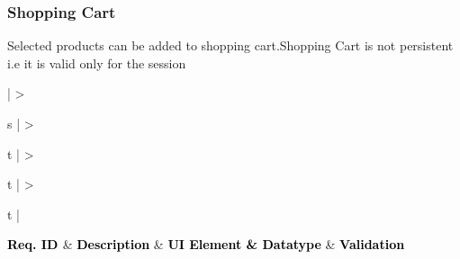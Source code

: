 \documentclass[hidelinks,a4paper,12pt]{article}
\begin{document}
\bigskip
\noindent

\subsubsection{Shopping Cart}
Selected products can be added to shopping cart.Shopping Cart is not \gls{persistent} i.e it is valid only for the session

\begin{center}
	{
	\setlength{\extrarowheight}{2pt}

	\newcolumntype{b}{X}
		
	\renewcommand\thetable{2} 					
	 \label{table:2}
	\vspace{0.25cm}
									
	\begin{tabularx}{\textwidth}{ | >{\ttfamily\raggedright\arraybackslash} s 
	| >{\ttfamily\raggedright\arraybackslash} t 
	| >{\ttfamily\raggedright\arraybackslash} t 	
	| >{\ttfamily\raggedright\arraybackslash} t | }
								
	\hline
								
	{\textbf{\textcolor{black}{ {Req. ID} \newline}}} & {\textbf{\textcolor{black}{ { Description}}}} & {\textbf{\textcolor{black}{ {UI Element \& Datatype}}}} & \textbf{\textcolor{black}{ {Validation}}} \\
								

\end{tabularx}}
\end{center}
\end{document}
